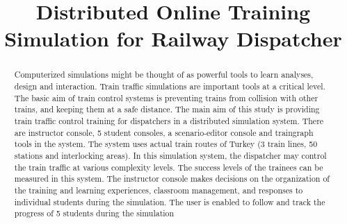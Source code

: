 \documentclass[conference]{IEEEtran}
\begin{document}
\title{Distributed Online Training Simulation for Railway Dispatcher }



\author{
}

\maketitle

\begin{abstract}
Computerized simulations might be thought of as powerful tools to learn analyses, design and interaction. Train traffic simulations are important tools at a critical level. The basic aim of train control systems is preventing trains from collision with other trains, and keeping them at a safe distance.
The main aim of this study is providing train traffic control training for dispatchers in a distributed simulation system. There are instructor console, 5 student consoles, a scenario-editor console and traingraph tools in the system. The system uses actual train routes of Turkey (3 train lines, 50 stations and interlocking areas). In this simulation system, the dispatcher may control the train   traffic at various complexity levels. The success levels of the trainees can be measured in this system. The instructor console makes decisions on the organization of the training and learning experiences, classroom management, and responses to individual   students during the simulation. The user is enabled to follow and track the progress of 5 students during the simulation

\end{abstract}
\end{document}
